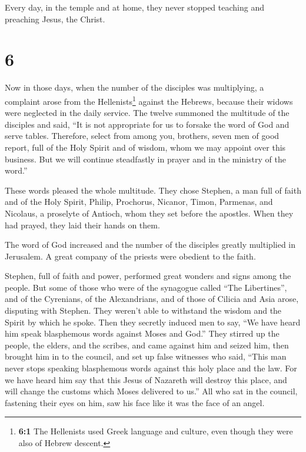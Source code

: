  Every day, in the temple and at home, they never stopped
teaching and preaching Jesus, the Christ.

\hypertarget{section-5}{%
\section{6}\label{section-5}}

 Now in those days, when the number of the disciples was
multiplying, a complaint arose from the Hellenists\footnote{\textbf{6:1}
  The Hellenists used Greek language and culture, even though they were
  also of Hebrew descent.} against the Hebrews, because their widows
were neglected in the daily service.  The twelve summoned
the multitude of the disciples and said, ``It is not appropriate for us
to forsake the word of God and serve tables.  Therefore,
select from among you, brothers, seven men of good report, full of the
Holy Spirit and of wisdom, whom we may appoint over this business.
 But we will continue steadfastly in prayer and in the
ministry of the word.''

 These words pleased the whole multitude. They chose
Stephen, a man full of faith and of the Holy Spirit, Philip, Prochorus,
Nicanor, Timon, Parmenas, and Nicolaus, a proselyte of Antioch,
 whom they set before the apostles. When they had prayed,
they laid their hands on them.

 The word of God increased and the number of the disciples
greatly multiplied in Jerusalem. A great company of the priests were
obedient to the faith.

 Stephen, full of faith and power, performed great wonders
and signs among the people.  But some of those who were of
the synagogue called ``The Libertines'', and of the Cyrenians, of the
Alexandrians, and of those of Cilicia and Asia arose, disputing with
Stephen.  They weren't able to withstand the wisdom and
the Spirit by which he spoke.  Then they secretly induced
men to say, ``We have heard him speak blasphemous words against Moses
and God.''  They stirred up the people, the elders, and
the scribes, and came against him and seized him, then brought him in to
the council,  and set up false witnesses who said, ``This
man never stops speaking blasphemous words against this holy place and
the law.  For we have heard him say that this Jesus of
Nazareth will destroy this place, and will change the customs which
Moses delivered to us.''  All who sat in the council,
fastening their eyes on him, saw his face like it was the face of an
angel.

